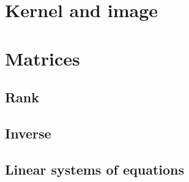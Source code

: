 

\section{Kernel and image}


\section{Matrices}

\subsection{Rank}

\subsection{Inverse}

\subsection{Linear systems of equations}




